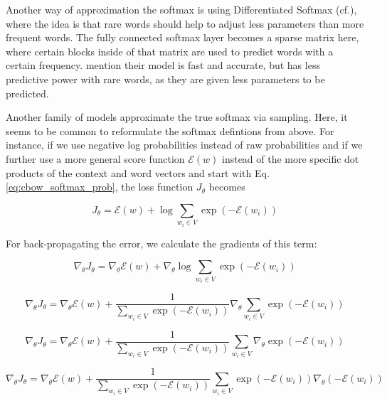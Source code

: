 \documentclass[11pt]{article}
\begin{document}
Another way of approximation the softmax is using Differentiated Softmax (cf.\cite{chen2015strategies}), where the idea is that rare words should help to adjust less parameters than  more frequent words. The fully connected softmax layer becomes a sparse matrix here, where certain blocks inside of that matrix are used to predict words with a certain frequency. \cite{chen2015strategies} mention their model is fast and accurate, but has less predictive power with rare words, as they are given less parameters to be predicted.



Another family of models approximate the true softmax via sampling. Here, it seems to be common to reformulate the softmax defintions from above. For instance, if we use negative log probabilities instead of raw probabilities and if we further use a more general score function $\mathcal{E}(w)$ instead of the more specific dot products of the context and word vectors and start with Eq.  \ref{eq:cbow_softmax_prob}, the loss function $J_{\theta}$ becomes 



\begin{equation}
J_\theta =\mathcal{E}(w) + \log \sum_{w_i \in V} \exp (-\mathcal{E}(w_i))
\label{eq:negative_reinforcement_1}
\end{equation}

For back-propagating the error, we calculate the gradients of this term:

\begin{equation}
\nabla_\theta J_\theta =\nabla_\theta \mathcal{E}(w) + \nabla_\theta \log \sum_{w_i \in V} \exp (-\mathcal{E}(w_i))
\label{eq:negative_reinforcement_2}
\end{equation}

\begin{equation}
\nabla_\theta J_\theta =\nabla_\theta \mathcal{E}(w) +\frac{1}{\sum_{w_i \in V} \exp (-\mathcal{E}(w_i))} \nabla_\theta  \sum_{w_i \in V} \exp (-\mathcal{E}(w_i))
\label{eq:negative_reinforcement_3}
\end{equation}


\begin{equation}
\nabla_\theta J_\theta =\nabla_\theta \mathcal{E}(w) +\frac{1}{\sum_{w_i \in V} \exp (-\mathcal{E}(w_i))}  \sum_{w_i \in V}\nabla_\theta \exp (-\mathcal{E}(w_i))
\label{eq:negative_reinforcement_4}
\end{equation}



\begin{equation}
\nabla_\theta J_\theta =\nabla_\theta \mathcal{E}(w) +\frac{1}{\sum_{w_i \in V} \exp (-\mathcal{E}(w_i))}  \sum_{w_i \in V} \exp (-\mathcal{E}(w_i))\nabla_\theta (-\mathcal{E}(w_i))
\label{eq:negative_reinforcement_5}
\end{equation}
\end{document}
